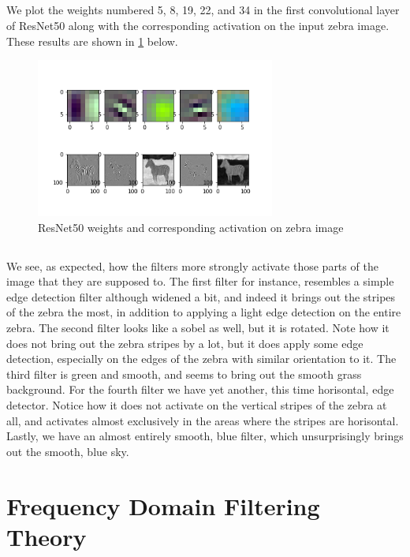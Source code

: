 \documentclass[]{article}
\begin{document}
\subsection{}
We plot the weights numbered 5, 8, 19, 22, and 34 in the first convolutional layer of ResNet50 along with the corresponding activation on the input zebra image. These results are shown in \ref{fig:zebra_activation} below.
\begin{figure}[H]
\centering
\includegraphics[width=0.7\textwidth]{zebra_activation}
\caption{ResNet50 weights and corresponding activation on zebra image}
\label{fig:zebra_activation}
\end{figure}

\subsection{}
We see, as expected, how the filters more strongly activate those parts of the image that they are supposed to. The first filter for instance, resembles a simple edge detection filter although widened a bit, and indeed it brings out the stripes of the zebra the most, in addition to applying a light edge detection on the entire zebra. The second filter looks like a sobel as well, but it is rotated. Note how it does not bring out the zebra stripes by a lot, but it does apply some edge detection, especially on the edges of the zebra with similar orientation to it. The third filter is green and smooth, and seems to bring out the smooth grass background. For the fourth filter we have yet another, this time horisontal, edge detector. Notice how it does not activate on the vertical stripes of the zebra at all, and activates almost exclusively in the areas where the stripes are horisontal. Lastly, we have an almost entirely smooth, blue filter, which unsurprisingly brings out the smooth, blue sky.

\section{Frequency Domain Filtering Theory}
\end{document}
